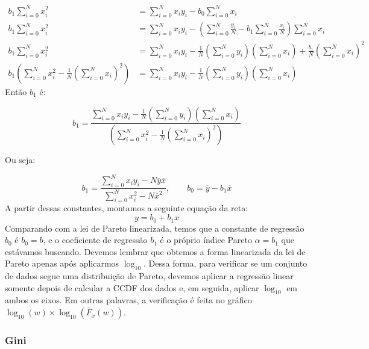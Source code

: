\begin{equation}
    \begin{split}
        b_{1}\sum_{i=0}^{N}x_{i}^{2}	& =\sum_{i=0}^{N}x_{i}y_{i}-b_{0}\sum_{i=0}^{N}x_{i} \\
        b_{1}\sum_{i=0}^{N}x_{i}^{2}	& =\sum_{i=0}^{N}x_{i}y_{i}-\left(\sum_{i=0}^{N}\frac{y_{i}}{N}-b_{1}\sum_{i=0}^{N}\frac{x_{i}}{N}\right)\sum_{i=0}^{N}x_{i} \\
        b_{1}\sum_{i=0}^{N}x_{i}^{2}	& =\sum_{i=0}^{N}x_{i}y_{i}-\frac{1}{N}\left(\sum_{i=0}^{N}y_{i}\right)\left(\sum_{i=0}^{N}x_{i}\right)+\frac{b_{1}}{N}\left(\sum_{i=0}^{N}x_{i}\right)^{2} \\
        b_{1}\left(\sum_{i=0}^{N}x_{i}^{2}-\frac{1}{N}\left(\sum_{i=0}^{N}x_{i}\right)^{2}\right)	& =\sum_{i=0}^{N}x_{i}y_{i}-\frac{1}{N}\left(\sum_{i=0}^{N}y_{i}\right)\left(\sum_{i=0}^{N}x_{i}\right)
    \end{split}
\end{equation}
Então $b_1$ é:

$$b_{1}=\frac{\sum_{i=0}^{N}x_{i}y_{i}-\frac{1}{N}\left(\sum_{i=0}^{N}y_{i}\right)\left(\sum_{i=0}^{N}x_{i}\right)}{\left(\sum_{i=0}^{N}x_{i}^{2}-\frac{1}{N}\left(\sum_{i=0}^{N}x_{i}\right)^{2}\right)}$$

Ou seja:

$$b_{1}=\frac{\sum_{i=0}^{N}x_{i}y_{i}-N\overline{y}\overline{x}}{\sum_{i=0}^{N}x_{i}^{2}-N\overline{x}^{2}},\qquad b_{0}=\overline{y}-b_{1}\overline{x}$$
A partir dessas constantes, montamos a seguinte equação da reta:
$$y=b_{0}+b_{1}x$$
Comparando com a lei de Pareto linearizada, temos que a constante de regressão  $b_0$ é  $b_0=b$,  e o coeficiente de regressão $b_1$ é o próprio índice Pareto $\alpha=b_1$  que estávamos buscando.  Devemos lembrar que obtemos a forma linearizada da lei de Pareto apenas após aplicarmos $\log_{10}$. Dessa forma, para verificar se um conjunto de dados segue uma distribuição de Pareto, devemos aplicar a regressão linear somente depois de calcular a CCDF dos dados e, em seguida, aplicar $\log_{10}$ em ambos os eixos. Em outras palavras, a verificação é feita no gráfico $\log_{10} (w) \times \log_{10} (\overline{F}_x(w))$.


\subsubsection*{Gini}



